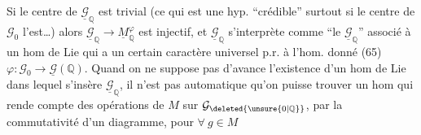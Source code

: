 Si le centre de $\underline{\mathcal{G}}_{\mathbb Q}$ est trivial (ce qui est une hyp. ``crédible'' surtout si le centre de $\mathcal{G}_0$ l'est\ldots) alors $\underline{\mathcal{G}}_{\mathbb Q}\longrightarrow\underline{M}_{\mathbb Q}^{\varphi}$ est injectif, et $\underline{\mathcal{G}}_{\mathbb Q}$ s'interprète comme ``le $\underline{\mathcal{G}}_{\mathbb Q}$'' associé à un hom de Lie
qui a un certain caractère universel p.r. à l'hom. donné (65) $\varphi:\mathcal{G}_0\longrightarrow\underline{\mathcal{G}}(\mathbb Q)$.
Quand on ne suppose pas d'avance l'existence d'un  hom de Lie dans lequel s'insère $\underline{\mathcal{G}}_{\mathbb Q}$, il n'est pas automatique qu'on puisse trouver un hom
qui rende compte des opérations de $M$ sur $\mathcal{G}_{\deleted{\unsure{0|\mathbb Q}}}$, par la commutativité d'un diagramme, pour $\forall\ g\in M$

